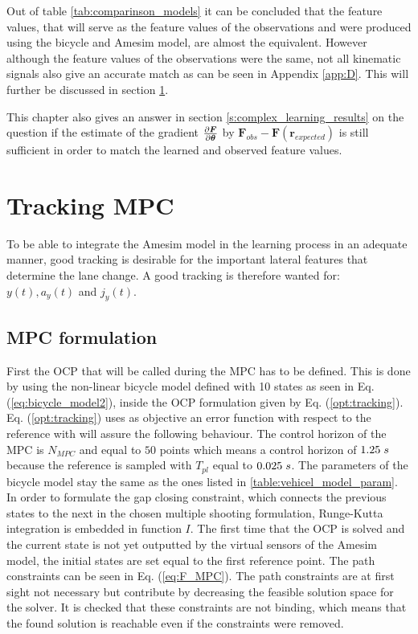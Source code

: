 Out of table \ref{tab:comparinson_models} it can be concluded that the feature values, that will serve as the feature values of the observations and were produced using the bicycle and Amesim model, are almost the equivalent. However although the feature values of the observations were the same, not all kinematic signals also give an accurate match as can be seen in Appendix \ref{app:D}. This will further be discussed in section \ref{s:tracking_mpc}. 

This chapter also gives an answer in section \ref{s:complex_learning_results} on the question if the estimate of the gradient $\pdv{\bm{F}}{\bm{\theta}}$ by $ \bm{F}_{obs} - \bm{F}(\bm{r}_{expected})$ is still sufficient in order to match the learned and observed feature values.

\section{Tracking MPC} 
\label{s:tracking_mpc}
To be able to integrate the Amesim model in the learning process in an adequate manner, good tracking is desirable for the important lateral features that determine the lane change. A good tracking is therefore wanted for: $y(t), a_y(t)$ and $j_y(t)$.

\subsection{MPC formulation}
First the OCP that will be called during the MPC has to be defined. This is done by using the non-linear bicycle model defined with 10 states as seen in Eq. (\ref{eq:bicycle_model2}), inside the OCP formulation given by Eq. (\ref{opt:tracking}). Eq. (\ref{opt:tracking}) uses as objective an error function with respect to the reference with will assure the following behaviour. The control horizon of the MPC is $N_{MPC}$ and equal to $50$ points which means a control horizon of $1.25 \hspace{1mm}s$ because the reference is sampled with $T_{pl}$ equal to $0.025\hspace{1mm}s$. The parameters of the bicycle model stay the same as the ones listed in \ref{table:vehicel_model_param}. In order to formulate the gap closing constraint, which connects the previous states to the next in the chosen multiple shooting formulation, Runge-Kutta integration is embedded in function $I$.  
The first time that the OCP is solved and the current state is not yet outputted by the virtual sensors of the Amesim model, the initial states are set equal to the first reference point. The path constraints can be seen in Eq. (\ref{eq:F_MPC}). The path constraints are at first sight not necessary but contribute by decreasing the feasible solution space for the solver. It is checked that these constraints are not binding, which means that the found solution is reachable even if the constraints were removed. 

